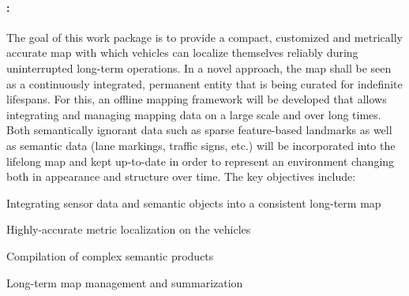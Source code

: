 
\paragraph{\WPMapping: \WPMappingTitle \\}

{\noindent\wptablefont
\label{wpmapping}

\wptableheaderB{\WPMappingVW}{\WPMappingETHZ}{\WPMappingIBM}{\WPMappingCLUJ}{\WPMappingPRAGUE}

The goal of this work package is to provide a compact, customized and metrically accurate map with which vehicles can localize themselves reliably during uninterrupted long-term operations. In a novel approach, the map shall be seen as a continuously integrated, permanent entity that is being curated for indefinite lifespans. For this, an offline mapping framework will be developed that allows integrating and managing mapping data on a large scale and over long times. Both semantically ignorant data such as sparse feature-based landmarks as well as semantic data (lane markings, traffic signs, etc.) will be incorporated into the lifelong map and kept up-to-date in order to represent an environment changing both in appearance and structure over time. %
The key objectives include:
\begin{denseItemize}
\item Integrating sensor data and semantic objects into a consistent long-term map
\item Highly-accurate metric localization on the vehicles
\item Compilation of complex semantic products
\item Long-term map management and summarization


\end{denseItemize}}
